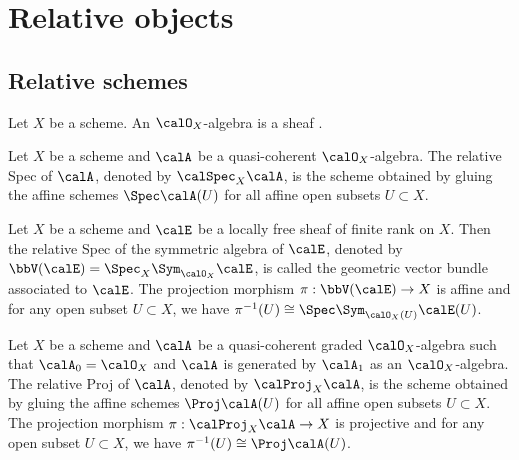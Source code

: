\section{Relative objects}

\subsection{Relative schemes}

    \begin{definition}\label{def:O_X_algebras_and_graded_O_X_algebras}
        Let \(X\) be a scheme.
        An \(\calO_X\)-algebra is a sheaf .
    \end{definition}

    \begin{definition}\label{def:relative_Spec}
        Let \(X\) be a scheme and \(\calA\) be a quasi-coherent \(\calO_X\)-algebra.
        The relative Spec of \(\calA\), denoted by \(\calSpec_X \calA\), is the scheme obtained by gluing the affine schemes \(\Spec \calA(U)\) for all affine open subsets \(U \subset X\).
    \end{definition}

    \begin{proposition}\label{prop:geometric_vector_bundles}
        Let \(X\) be a scheme and \(\calE\) be a locally free sheaf of finite rank on \(X\).
        Then the relative Spec of the symmetric algebra of \(\calE\), denoted by \(\bbV(\calE) = \Spec_X \Sym_{\calO_X} \calE\), is called the geometric vector bundle associated to \(\calE\).
        The projection morphism \(\pi : \bbV(\calE) \to X\) is affine and for any open subset \(U \subset X\), we have \(\pi^{-1}(U) \cong \Spec \Sym_{\calO_X(U)} \calE(U)\).
    \end{proposition}

    \begin{definition}\label{def:relative_Proj}
        Let \(X\) be a scheme and \(\calA\) be a quasi-coherent graded \(\calO_X\)-algebra such that \(\calA_0 = \calO_X\) and \(\calA\) is generated by \(\calA_1\) as an \(\calO_X\)-algebra.
        The relative Proj of \(\calA\), denoted by \(\calProj_X \calA\), is the scheme obtained by gluing the affine schemes \(\Proj \calA(U)\) for all affine open subsets \(U \subset X\).
        The projection morphism \(\pi : \calProj_X \calA \to X\) is projective and for any open subset \(U \subset X\), we have \(\pi^{-1}(U) \cong \Proj \calA(U)\).
    \end{definition}


